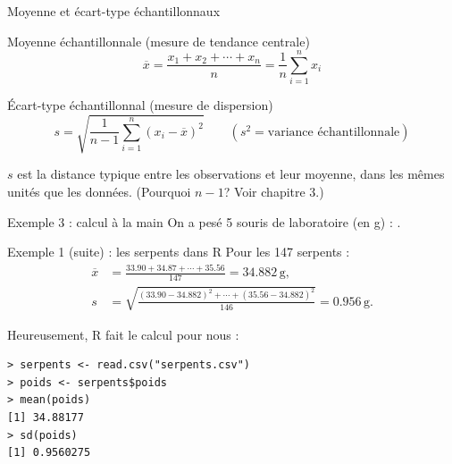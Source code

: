 \documentclass{BeamerTemplate}
\begin{document}
\begin{frame}[t]{Moyenne et écart-type échantillonnaux}
  \begin{Boite}{Moyenne échantillonnale (mesure de tendance centrale)}
    \[ \overline{x} = \frac{x_1 + x_2 + \cdots + x_n}{n}
       = \frac{1}{n} \sum_{i=1}^{n} x_i \]
  \end{Boite}


  \begin{Boite}{Écart-type échantillonnal (mesure de dispersion)}
    \[ s = \sqrt{\frac{1}{n-1} \sum_{i=1}^{n} (x_i - \overline{x})^2}
       \qquad (s^2 = \text{variance échantillonnale}) \]
  \end{Boite}
  {\small $s$ est la \alert{distance typique} entre les observations et leur
  moyenne, dans les \alert{mêmes unités} que les données.
  {\color{gray} (Pourquoi $n-1$? Voir chapitre 3.)}\par}

\end{frame}

\begin{frame}[t]{Exemple 3 : calcul à la main}
  On a pesé 5 souris de laboratoire (en g) :     .

  \medskip

  \medskip
\end{frame}

\begin{frame}[fragile,t]{Exemple 1 (suite) : les serpents dans R}
  Pour les 147 serpents :
  \begin{align*}
    \overline{x} &= \frac{33.90 + 34.87 + \cdots + 35.56}{147} = 34.882\,\text{g}, \\
    s &= \sqrt{\frac{(33.90 - 34.882)^2 + \cdots + (35.56 - 34.882)^2}{146}}
      = 0.956\,\text{g}.
  \end{align*}

  Heureusement, R fait le calcul pour nous :
\begin{Verbatim}[fontsize=\scriptsize, formatcom=\color{TexteBoite}]
> serpents <- read.csv("serpents.csv")
> poids <- serpents$poids
> mean(poids)
[1] 34.88177
> sd(poids)
[1] 0.9560275
\end{Verbatim}
\end{frame}
\end{document}
